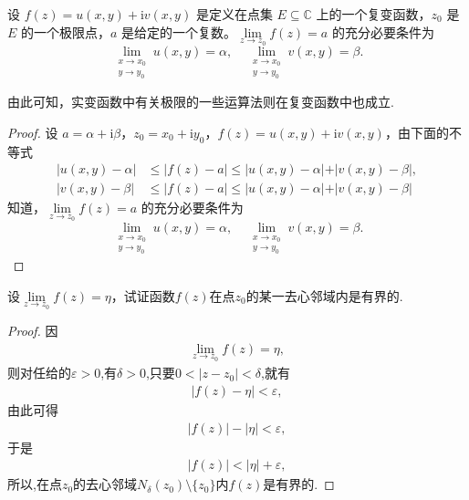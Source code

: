 \documentclass[../../main.tex]{subfiles}%
\begin{document}
\begin{theorem}\label{theorem:复变函数极限存在充要条件1.7}
设 $f(z) = u(x, y) + \mathrm{i}v(x, y)$ 是定义在点集 $E\subseteq \mathbb{C}$ 上的一个复变函数，$z_0$ 是 $E$ 的一个极限点，$a$ 是给定的一个复数。$\lim\limits_{z \to z_0} f(z) = a$ 的充分必要条件为
\[
\lim_{\substack{x \to x_0 \\ y \to y_0}} u(x, y) = \alpha, \quad \lim_{\substack{x \to x_0 \\ y \to y_0}} v(x, y) = \beta.
\]
\end{theorem}
\begin{note}
由此可知，实变函数中有关极限的一些运算法则在复变函数中也成立.
\end{note}
\begin{proof}

设 $a = \alpha + \mathrm{i}\beta$，$z_0 = x_0 + \mathrm{i}y_0$，$f(z) = u(x, y) + \mathrm{i}v(x, y)$，由下面的不等式
\begin{align*}
\vert u(x, y) - \alpha \vert &\leqslant \vert f(z) - a \vert \leqslant \vert u(x, y) - \alpha \vert + \vert v(x, y) - \beta \vert, \\
\vert v(x, y) - \beta \vert &\leqslant \vert f(z) - a \vert \leqslant \vert u(x, y) - \alpha \vert + \vert v(x, y) - \beta \vert 
\end{align*}
知道，$\lim\limits_{z \to z_0} f(z) = a$ 的充分必要条件为
\[
\lim_{\substack{x \to x_0 \\ y \to y_0}} u(x, y) = \alpha, \quad \lim_{\substack{x \to x_0 \\ y \to y_0}} v(x, y) = \beta.
\]

\end{proof}

\begin{proposition}\label{proposition:复变函数--例题1.31}
设$\lim\limits_{z\to z_0}f(z)=\eta$，试证函数$f(z)$在点$z_0$的某一去心邻域内是有界的.
\end{proposition}
\begin{proof}

因
\begin{align*}
\lim\limits_{z\to z_0}f(z)=\eta,
\end{align*}
则对任给的$\varepsilon>0$,有$\delta>0$,只要$0<|z-z_0|<\delta$,就有
\begin{align*}
|f(z)-\eta|<\varepsilon,
\end{align*}
由此可得
\begin{align*}
|f(z)|-|\eta|<\varepsilon,
\end{align*}
于是
\begin{align*}
|f(z)|<|\eta|+\varepsilon,
\end{align*}
所以,在点$z_0$的去心邻域$N_\delta(z_0)\setminus\{z_0\}$内$f(z)$是有界的.

\end{proof}
\end{document}
